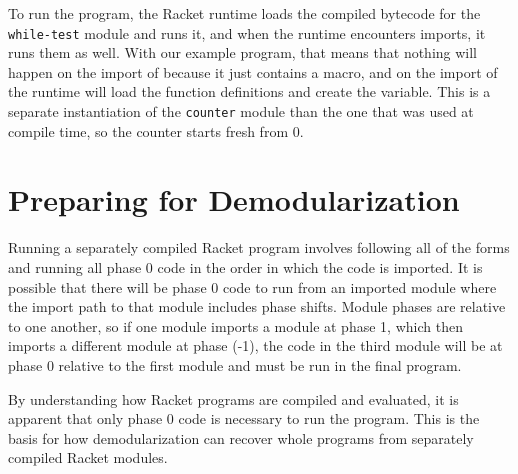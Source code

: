 To run the program, the Racket runtime loads the compiled bytecode for the \texttt{while-test} module and runs it, and when the runtime encounters imports, it runs them as well. 
With our example program, that means that nothing will happen on the import of  because it just contains a macro, and on the import of  the runtime will load the function definitions and create the  variable.
This is a separate instantiation of the \texttt{counter} module than the one that was used at compile time, so the counter starts fresh from 0.



\section{Preparing for Demodularization}

Running a separately compiled Racket program involves following all of the  forms and running all phase 0 code in the order in which the code is imported.
It is possible that there will be phase 0 code to run from an imported module where the import path to that module includes phase shifts.
Module phases are relative to one another, so if one module imports a module at phase 1, which then imports a different module at phase (-1), the code in the third module will be at phase 0 relative to the first module and must be run in the final program.

By understanding how Racket programs are compiled and evaluated, it is apparent that only phase 0 code is necessary to run the program. 
This is the basis for how demodularization can recover whole programs from separately compiled Racket modules. 
